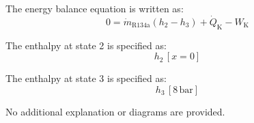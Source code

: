 The energy balance equation is written as:  
\[
0 = \dot{m}_{\text{R134a}} \left( h_2 - h_3 \right) + \dot{Q}_{\text{K}} - W_{\text{K}}
\]  

The enthalpy at state 2 is specified as:  
\[
h_2 \, [x = 0]
\]  

The enthalpy at state 3 is specified as:  
\[
h_3 \, [8 \, \text{bar}]
\]  

No additional explanation or diagrams are provided.